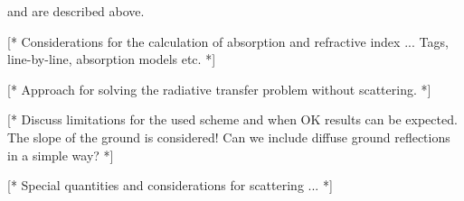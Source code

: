 \label{sec:fm_defs:scandef}


\label{sec:fm_defs:sensorvars}

 and  are described above.


\label{sec:fm_defs:absorption}

[* Considerations for the calculation of absorption and refractive index ...
Tags, line-by-line, absorption models etc. *]



\label{sec:fm_defs:rte}

[* Approach for solving the radiative transfer problem without scattering. *]


\label{sec:fm_defs:groundrefl}

[* Discuss limitations for the used scheme and when OK results can be
expected. The slope of the ground is considered! Can we include
diffuse ground reflections in a simple way? *]



\label{sec:fm_defs:scattering}

[* Special quantities and considerations for scattering ... *]


